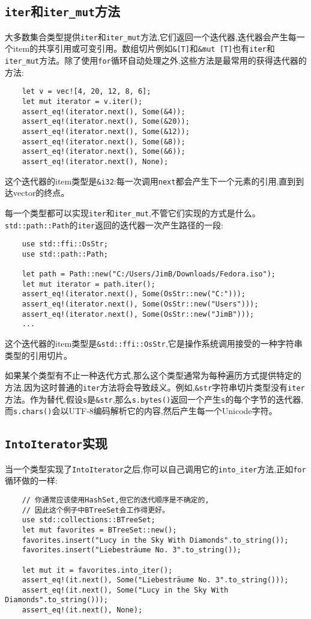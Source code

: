 \subsection{\texttt{iter}和\texttt{iter\_mut}方法}\label{IterMethod}
大多数集合类型提供\texttt{iter}和\texttt{iter\_mut}方法,它们返回一个迭代器,迭代器会产生每一个item的共享引用或可变引用。数组切片例如\texttt{\&[T]}和\texttt{\&mut [T]}也有\texttt{iter}和\texttt{iter\_mut}方法。除了使用\texttt{for}循环自动处理之外,这些方法是最常用的获得迭代器的方法:
\begin{verbatim}
    let v = vec![4, 20, 12, 8, 6];
    let mut iterator = v.iter();
    assert_eq!(iterator.next(), Some(&4));
    assert_eq!(iterator.next(), Some(&20));
    assert_eq!(iterator.next(), Some(&12));
    assert_eq!(iterator.next(), Some(&8));
    assert_eq!(iterator.next(), Some(&6));
    assert_eq!(iterator.next(), None);
\end{verbatim}

这个迭代器的item类型是\texttt{\&i32}:每一次调用\texttt{next}都会产生下一个元素的引用,直到到达vector的终点。

每一个类型都可以实现\texttt{iter}和\texttt{iter\_mut},不管它们实现的方式是什么。\texttt{std::path::Path}的\texttt{iter}返回的迭代器一次产生路径的一段:
\begin{verbatim}
    use std::ffi::OsStr;
    use std::path::Path;

    let path = Path::new("C:/Users/JimB/Downloads/Fedora.iso");
    let mut iterator = path.iter();
    assert_eq!(iterator.next(), Some(OsStr::new("C:")));
    assert_eq!(iterator.next(), Some(OsStr::new("Users")));
    assert_eq!(iterator.next(), Some(OsStr::new("JimB")));
    ...
\end{verbatim}

这个迭代器的item类型是\texttt{\&std::ffi::OsStr},它是操作系统调用接受的一种字符串类型的引用切片。

如果某个类型有不止一种迭代方式,那么这个类型通常为每种遍历方式提供特定的方法,因为这时普通的\texttt{iter}方法将会导致歧义。例如,\texttt{\&str}字符串切片类型没有\texttt{iter}方法。作为替代,假设\texttt{s}是\texttt{\&str},那么\texttt{s.bytes()}返回一个产生\texttt{s}的每个字节的迭代器,而\texttt{s.chars()}会以UTF-8编码解析它的内容,然后产生每一个Unicode字符。

\subsection{\texttt{IntoIterator}实现}\label{IntoIter}
当一个类型实现了\texttt{IntoIterator}之后,你可以自己调用它的\texttt{into\_iter}方法,正如\texttt{for}循环做的一样:
\begin{verbatim}
    // 你通常应该使用HashSet,但它的迭代顺序是不确定的,
    // 因此这个例子中BTreeSet会工作得更好。
    use std::collections::BTreeSet;
    let mut favorites = BTreeSet::new();
    favorites.insert("Lucy in the Sky With Diamonds".to_string());
    favorites.insert("Liebesträume No. 3".to_string());

    let mut it = favorites.into_iter();
    assert_eq!(it.next(), Some("Liebesträume No. 3".to_string()));
    assert_eq!(it.next(), Some("Lucy in the Sky With Diamonds".to_string()));
    assert_eq!(it.next(), None);
\end{verbatim}

